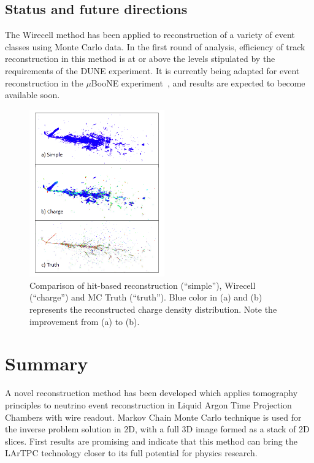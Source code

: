 \documentclass[a4paper]{jpconf}
\begin{document}
\subsection{Status and future directions}
The Wirecell method has been applied to reconstruction of a variety of event classes using Monte Carlo data. In the first round of analysis,
efficiency of track reconstruction in this method is at or above the levels stipulated by the requirements of the DUNE experiment.
It is currently being adapted for
event reconstruction in the $\mu$BooNE experiment~\cite{uboone}, and results are expected to become available soon.
\begin{figure}[h!]
	\centering
	\includegraphics[width=0.52\textwidth]{wirecell_vs_mc.png}
	\caption{Comparison of hit-based reconstruction (``simple''), Wirecell (``charge'') and MC Truth (``truth'').
Blue color in (a) and (b) represents the reconstructed charge density distribution. Note the improvement from (a) to (b).}
	\label{fig:wirecell_vs_mc}
\end{figure}
\section{Summary}
A novel reconstruction method has been developed which applies tomography principles to
neutrino event reconstruction in Liquid Argon Time Projection Chambers with
wire readout. Markov Chain Monte Carlo technique is used for the inverse problem solution in 2D, with a full 3D image formed as a stack of 2D slices.
First results are promising and indicate that this method can bring the LArTPC technology closer to its full potential for physics research.
\end{document}
